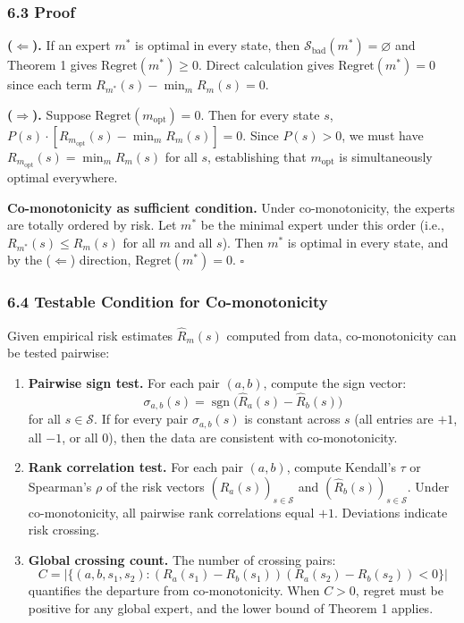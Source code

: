 \documentclass[
  12pt,
]{article}
\begin{document}
\subsubsection{6.3 Proof}\label{proof-2}

\textbf{(\(\Leftarrow\)).} If an expert \(m^*\) is optimal in every
state, then \(\mathcal{S}_{\text{bad}}(m^*) = \varnothing\) and Theorem
1 gives \(\text{Regret}(m^*) \geq 0\). Direct calculation gives
\(\text{Regret}(m^*) = 0\) since each term
\(R_{m^*}(s) - \min_m R_m(s) = 0\).

\textbf{(\(\Rightarrow\)).} Suppose
\(\text{Regret}(m_{\text{opt}}) = 0\). Then for every state \(s\),
\(P(s) \cdot [R_{m_{\text{opt}}}(s) - \min_m R_m(s)] = 0\). Since
\(P(s) > 0\), we must have \(R_{m_{\text{opt}}}(s) = \min_m R_m(s)\) for
all \(s\), establishing that \(m_{\text{opt}}\) is simultaneously
optimal everywhere.

\textbf{Co-monotonicity as sufficient condition.} Under co-monotonicity,
the experts are totally ordered by risk. Let \(m^*\) be the minimal
expert under this order (i.e., \(R_{m^*}(s) \leq R_m(s)\) for all \(m\)
and all \(s\)). Then \(m^*\) is optimal in every state, and by the
(\(\Leftarrow\)) direction, \(\text{Regret}(m^*) = 0\). \(\square\)

\subsubsection{6.4 Testable Condition for
Co-monotonicity}\label{testable-condition-for-co-monotonicity}

Given empirical risk estimates \(\hat{R}_m(s)\) computed from data,
co-monotonicity can be tested pairwise:

\begin{enumerate}
\def\labelenumi{\arabic{enumi}.}
\item
  \textbf{Pairwise sign test.} For each pair \((a, b)\), compute the
  sign vector:
  \[\sigma_{a,b}(s) = \operatorname{sgn}\bigl(\hat{R}_a(s) - \hat{R}_b(s)\bigr)\]
  for all \(s \in \mathcal{S}\). If for every pair \(\sigma_{a,b}(s)\)
  is constant across \(s\) (all entries are \(+1\), all \(-1\), or all
  \(0\)), then the data are consistent with co-monotonicity.
\item
  \textbf{Rank correlation test.} For each pair \((a, b)\), compute
  Kendall's \(\tau\) or Spearman's \(\rho\) of the risk vectors
  \((\hat{R}_a(s))_{s \in \mathcal{S}}\) and
  \((\hat{R}_b(s))_{s \in \mathcal{S}}\). Under co-monotonicity, all
  pairwise rank correlations equal \(+1\). Deviations indicate risk
  crossing.
\item
  \textbf{Global crossing count.} The number of crossing pairs:
  \[C = \bigl|\{(a, b, s_1, s_2) : (R_a(s_1) - R_b(s_1))(R_a(s_2) - R_b(s_2)) < 0\}\bigr|\]
  quantifies the departure from co-monotonicity. When \(C > 0\), regret
  must be positive for any global expert, and the lower bound of Theorem
  1 applies.
\end{enumerate}
\end{document}
